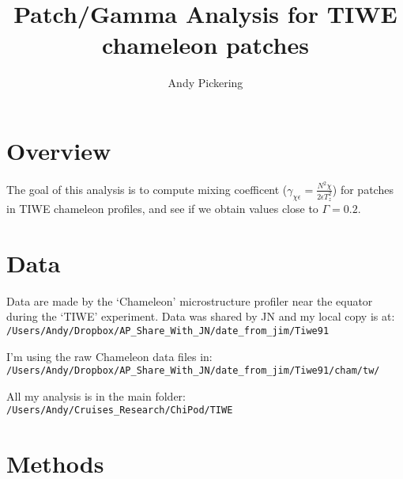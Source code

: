 \documentclass[11pt]{article}
\title{Patch/Gamma Analysis for TIWE chameleon patches}
\author{Andy Pickering}
\begin{document}
\maketitle

\tableofcontents
\newpage

\section{Overview}

The goal of this analysis is to compute mixing coefficent ($\gamma_{\chi\epsilon}=\frac{N^2 \chi}{2\epsilon T_{z}^{2}} $) for patches in TIWE chameleon profiles, and see if we obtain values close to $\Gamma=0.2$.

\section{Data}

Data are made by the `Chameleon' microstructure profiler near the equator during the `TIWE' experiment. Data was shared by JN and my local copy is at: \newline \verb+/Users/Andy/Dropbox/AP_Share_With_JN/date_from_jim/Tiwe91+

\medskip

I'm using the raw Chameleon data files in: \newline
\verb+/Users/Andy/Dropbox/AP_Share_With_JN/date_from_jim/Tiwe91/cham/tw/+

\medskip

All my analysis is in the main folder: \newline  \verb+/Users/Andy/Cruises_Research/ChiPod/TIWE+


\section{Methods}
\end{document}
